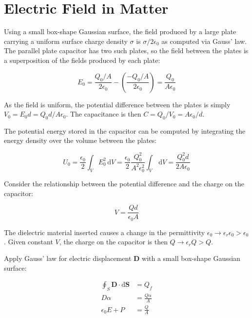 \documentclass[12pt]{article}
\begin{document}



\pagebreak
\section*{Electric Field in Matter}



Using a small box-shape Gaussian surface, the field produced by a large plate carrying a uniform surface charge density $\sigma$ is $\sigma/2\epsilon_{0}$ as computed via Gauss' law. The parallel plate capacitor has two such plates, so the field between the plates is a superposition of the fields produced by each plate:

\begin{equation}
    E_{0} = \frac{Q_{0}/A}{2\epsilon_{0}} - \left( \frac{-Q_{0}/A}{2\epsilon_{0}} \right) = \frac{Q_{0}}{A\epsilon_{0}}
\end{equation}

As the field is uniform, the potential difference between the plates is simply $V_{0} = E_{0}d = Q_{0}d/A\epsilon_{0}$. The capacitance is then $C = Q_{0}/V_{0} = A\epsilon_{0}/d$.

The potential energy stored in the capacitor can be computed by integrating the energy density over the volume between the plates:

\begin{equation}
    U_{0} = \frac{\epsilon_{0}}{2} \int_{V} E_{0}^{2} \, \mathrm{d}V = \frac{\epsilon_{0}}{2} \frac{Q_{0}^{2}}{A^{2}\epsilon_{0}^{2}} \int_{V} \, \mathrm{d}V = \frac{Q_{0}^{2}d}{2A\epsilon_{0}}
\end{equation}

Consider the relationship between the potential difference and the charge on the capacitor:

\begin{equation}
    V = \frac{Qd}{\epsilon_{0}A}
\end{equation}

The dielectric material inserted causes a change in the permittivity $\epsilon_{0} \to \epsilon_{r} \epsilon_{0} > \epsilon_{0}$. Given constant $V$, the charge on the capacitor is then $Q \to \epsilon_{r}Q > Q$.

Apply Gauss' law for electric displacement $\mathbf{D}$ with a small box-shape Gaussian surface:

\begin{equation}
    \begin{split}
        \oint_{S} \mathbf{D} \cdot \mathrm{d}\mathbf{S} &= Q_{f} \\
        D \alpha &= \frac{Q\alpha}{A} \\
        \epsilon_{0} E + P &= \frac{Q}{A}
    \end{split}
\end{equation}
\end{document}
